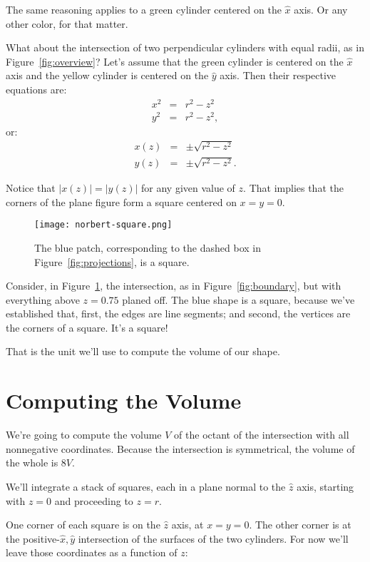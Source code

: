 \documentclass[twocolumn]{article}
\theoremstyle{definition}
\theoremstyle{plain}
\begin{document}
The same reasoning applies to a green cylinder centered on the
$\hat{x}$ axis.  Or any other color, for that matter.

What about the intersection of two perpendicular cylinders with equal
radii, as in Figure~\ref{fig:overview}?  Let's assume that the green
cylinder is centered on the $\hat{x}$ axis and the yellow cylinder is
centered on the $\hat{y}$ axis.  Then their respective equations are:
\begin{eqnarray*}
  x^2 & = & r^2 - z^2 \\
  y^2 & = & r^2 - z^2,
\end{eqnarray*}
or:
\begin{eqnarray}
  x(z) & = & \pm \sqrt{r^2 - z^2} \label{eq:x(z)} \\
  y(z) & = & \pm \sqrt{r^2 - z^2}. \label{eq:y(z)}
\end{eqnarray}

Notice that $|x(z)| = |y(z)|$ for any given value of $z$.  That implies
that the corners of the plane figure form a square centered on $x = y
= 0$.

\begin{figure}
  \texttt{[image: norbert-square.png]}
  \caption{The blue patch, corresponding to the dashed box in
    Figure~\ref{fig:projections}, is a square.}
  \label{fig:square}
\end{figure}

Consider, in Figure~\ref{fig:square}, the intersection, as in
Figure~\ref{fig:boundary}, but with everything
above $z=0.75$ planed off.  The blue shape is a square, because we've
established that, first, the edges are line segments; and second, the
vertices are the corners of a square.  It's a square!

That is the unit we'll use to compute the volume of our shape.

\section{Computing the Volume}
\label{sec:computing}

We're going to compute the volume $V$ of the octant of the
intersection with all nonnegative coordinates.  Because the
intersection is symmetrical, the volume of the whole is $8V$.

We'll integrate a stack of squares, each in a plane normal to the
$\hat{z}$ axis, starting with $z=0$ and proceeding to $z=r$.

One corner of each square is on the $\hat{z}$ axis, at $x=y=0$.  The
other corner is at the positive-$\hat{x},\hat{y}$ intersection of the
surfaces of the two cylinders.  For now we'll leave those coordinates
as a function of $z$:
\end{document}

